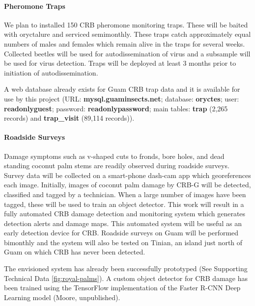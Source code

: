 \documentclass[12pt,letterpaper,english,bibliography=totocnumbered, abstract=on]{scrartcl}
\begin{document}
\paragraph{Pheromone Traps}

We plan to installed 150 CRB pheromone monitoring traps. These will be baited with oryctalure and serviced semimonthly. These traps catch approximately equal numbers of males and females which remain alive in the traps for several weeks. Collected beetles will be used for autodissemination of virus and a subsample will be used for virus detection. Traps will be deployed at least 3 months prior to initiation of autodissemination.  

A web database already exists for Guam CRB trap data and it is available for use by this project (URL: \textbf{mysql.guaminsects.net}; database: \textbf{oryctes}; user: \textbf{readonlyguest}; password: \textbf{readonlypassword}; main tables: \textbf{trap} (2,265 records) and \textbf{trap\_visit} (89,114 records)).

\paragraph{Roadside Surveys}

Damage symptoms such as v-shaped cuts to fronds, bore holes, and dead standing coconut palm stems are readily observed during roadside surveys. Survey data will be collected on a smart-phone dash-cam app which georeferences each image. Initially, images of coconut palm damage by CRB-G will be detected, classified and tagged by a technician. When a large number of images have been tagged, these will be used to train an object detector. This work will result in a fully automated CRB damage detection and monitoring system which generates detection alerts and damage maps. This automated system will be useful as an early detection device for CRB. Roadside surveys on Guam will be performed bimonthly and the system will also be tested on Tinian, an island just north of Guam on which CRB has never been detected.

The envisioned system has already been successfully prototyped (See Supporting Technical Data \ref{fig:royal-palms}). A custom object detector for CRB damage has been trained using the TensorFlow implementation of the Faster R-CNN Deep Learning model (Moore, unpublished).
\end{document}
